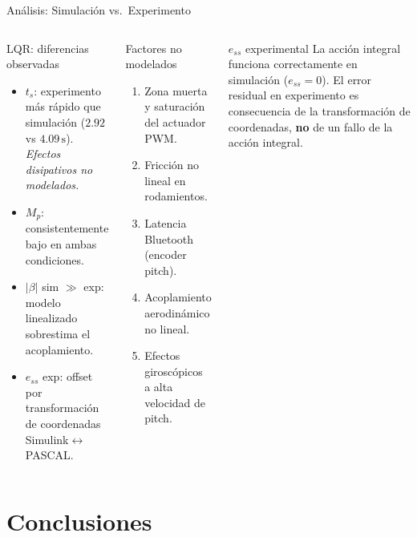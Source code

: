 \documentclass[mathserif,spanish,10pt]{beamer}
\newcommand{\good}[1]{\textcolor{passgreen}{#1}}
\begin{document}
\begin{frame}{Análisis: Simulación vs.\ Experimento}
\begin{columns}[T]
  \begin{block}{LQR: diferencias observadas}
    \begin{itemize}
      \item $t_s$: experimento \good{más rápido} que simulación ($2.92$ vs $4.09\,\text{s}$). \textit{Efectos disipativos no modelados.}
      \item $M_p$: consistentemente bajo en ambas condiciones.
      \item $|\beta|$ sim $\gg$ exp: modelo linealizado sobrestima el acoplamiento.
      \item $e_{ss}$ exp: offset por transformación de coordenadas Simulink$\leftrightarrow$PASCAL.
    \end{itemize}
  \end{block}

  \begin{block}{Factores no modelados}
    \scriptsize
    \begin{enumerate}
      \item Zona muerta y saturación del actuador PWM.
      \item Fricción no lineal en rodamientos.
      \item Latencia Bluetooth (encoder pitch).
      \item Acoplamiento aerodinámico no lineal.
      \item Efectos giroscópicos a alta velocidad de pitch.
    \end{enumerate}
  \end{block}

  \begin{alertblock}{$e_{ss}$ experimental}
    \scriptsize
    La acción integral funciona correctamente en simulación ($e_{ss}=0$). El error residual en experimento es consecuencia de la transformación de coordenadas, \textbf{no} de un fallo de la acción integral.
  \end{alertblock}
\end{columns}
\end{frame}

\section{Conclusiones}
\end{document}
